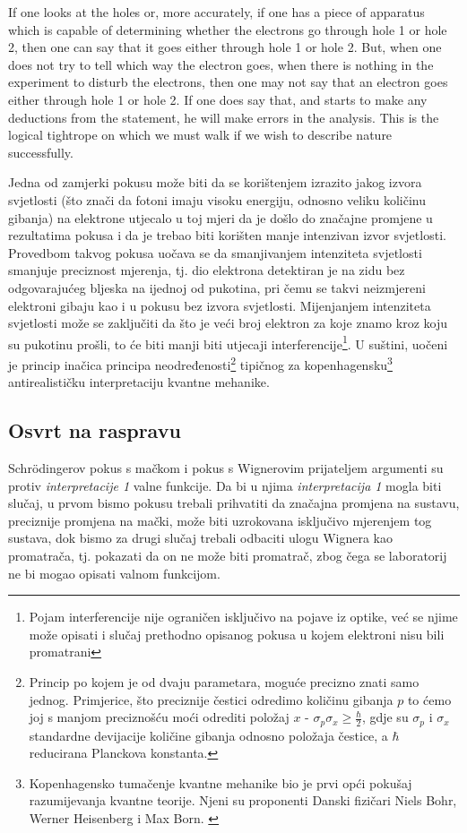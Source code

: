 \documentclass[twoside]{article}
\begin{document}
\begin{displayquote}
If one looks at the holes or, more accurately, if one has a piece of apparatus which is capable of determining whether the electrons go through hole 1 or hole 2, then one can say that it goes either through hole 1 or hole 2. But, when one does not try to tell which way the electron goes, when there is nothing in the experiment to disturb the electrons, then one may not say that an electron goes either through hole 1 or hole 2. If one does say that, and starts to make any deductions from the statement, he will make errors in the analysis. This is the logical tightrope on which we must walk if we wish to describe nature successfully.\cite{Feynman2010}
\end{displayquote}

\noindent
Jedna od zamjerki pokusu može biti da se korištenjem izrazito jakog izvora svjetlosti (što znači da fotoni imaju visoku energiju, odnosno veliku količinu gibanja) na elektrone utjecalo u toj mjeri da je došlo do značajne promjene u rezultatima pokusa i da je trebao biti korišten manje intenzivan izvor svjetlosti. Provedbom takvog pokusa \cite{Feynman2010} uočava se da smanjivanjem intenziteta svjetlosti smanjuje preciznost mjerenja, tj. dio elektrona detektiran je na zidu bez odgovarajućeg bljeska na ijednoj od pukotina, pri čemu se takvi neizmjereni elektroni gibaju kao i u pokusu bez izvora svjetlosti. Mijenjanjem intenziteta svjetlosti može se zaključiti da što je veći broj elektron za koje znamo kroz koju su pukotinu prošli, to će biti manji biti utjecaji interferencije\footnote{Pojam interferencije nije ograničen isključivo na pojave iz optike, već se njime može opisati i slučaj prethodno opisanog pokusa u kojem elektroni nisu bili promatrani}. U suštini, uočeni je princip inačica principa neodređenosti\footnote{Princip po kojem je od dvaju parametara, moguće precizno znati samo jednog. Primjerice, što preciznije čestici odredimo količinu gibanja $p$ to ćemo joj s manjom preciznošću moći odrediti položaj $x$ - $\sigma_p\sigma_x \geq \frac{\hbar}{2}$, gdje su $\sigma_p$ i $\sigma_x$ standardne devijacije količine gibanja odnosno položaja čestice, a $\hbar$ reducirana Planckova konstanta.} tipičnog za kopenhagensku\footnote{Kopenhagensko tumačenje kvantne mehanike bio je prvi opći pokušaj razumijevanja kvantne teorije. Njeni su proponenti Danski fizičari Niels Bohr, Werner Heisenberg i Max Born. \cite{Faye2019}} antirealističku interpretaciju kvantne mehanike.

\subsection{Osvrt na raspravu}
Schrödingerov pokus s mačkom i pokus s Wignerovim prijateljem argumenti su protiv \emph{interpretacije 1} valne funkcije. Da bi u njima \emph{interpretacija 1} mogla biti slučaj, u prvom bismo pokusu trebali prihvatiti da značajna promjena na sustavu, preciznije promjena na mački, može biti uzrokovana isključivo mjerenjem tog sustava, dok bismo za drugi slučaj trebali odbaciti ulogu Wignera kao promatrača, tj. pokazati da on ne može biti promatrač, zbog čega se laboratorij ne bi mogao opisati valnom funkcijom. 
\end{document}
